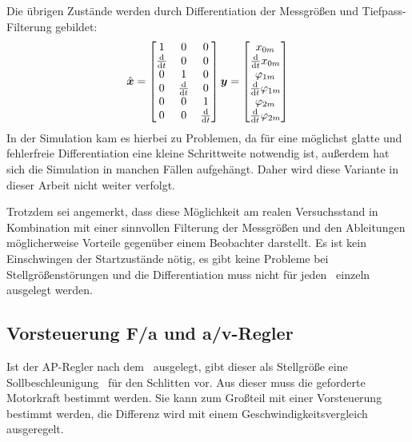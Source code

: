 \subsubsection{\diff}
Die übrigen Zustände werden durch Differentiation der Messgrößen und \evtl Tiefpass-Filterung gebildet:
\begin{align}
	\hat{\boldsymbol{x}}=\begin{bmatrix}
		1	&	0	&	0	\\
		\frac{\mathrm{d}}{\mathrm{d} t}	&	0	&	0	\\
		0	&	1	&	0	\\
		0	&	\frac{\mathrm{d}}{\mathrm{d} t}	&	0	\\
		0	&	0	&	1	\\
		0	&	0	&	\frac{\mathrm{d}}{\mathrm{d} t}	\\
	\end{bmatrix} \boldsymbol{y}  = \begin{bmatrix}
		x_{0m} \\ \frac{\mathrm{d}}{\mathrm{d} t} x_{0m} \\ \varphi_{1m} \\ \frac{\mathrm{d}}{\mathrm{d} t} \varphi_{1m} \\ \varphi_{2m} \\ \frac{\mathrm{d}}{\mathrm{d} t} \varphi_{2m}
	\end{bmatrix}
\end{align}
In der Simulation kam es hierbei zu Problemen, da für eine möglichst glatte und fehlerfreie Differentiation eine kleine Schrittweite notwendig ist, außerdem hat sich die Simulation in manchen Fällen aufgehängt. Daher wird diese Variante in dieser Arbeit nicht weiter verfolgt.

Trotzdem sei angemerkt, dass diese Möglichkeit am realen Versuchsstand in Kombination mit einer sinnvollen Filterung der Messgrößen und den Ableitungen möglicherweise Vorteile gegenüber einem Beobachter darstellt. 
Es ist kein Einschwingen der Startzustände nötig, es gibt keine Probleme bei Stellgrößenstörungen und die Differentiation muss nicht für jeden \ap\ einzeln ausgelegt werden.


\subsection{Vorsteuerung F/a und a/v-Regler}\label{subsec:vorstfa}

Ist der AP-Regler nach dem \bss\ ausgelegt, gibt dieser als Stellgröße eine Sollbeschleunigung \asoll\ für den Schlitten vor. 
Aus dieser muss die geforderte Motorkraft bestimmt werden.
Sie kann zum Großteil mit einer Vorsteuerung bestimmt werden, die Differenz wird mit einem Geschwindigkeitsvergleich ausgeregelt.


